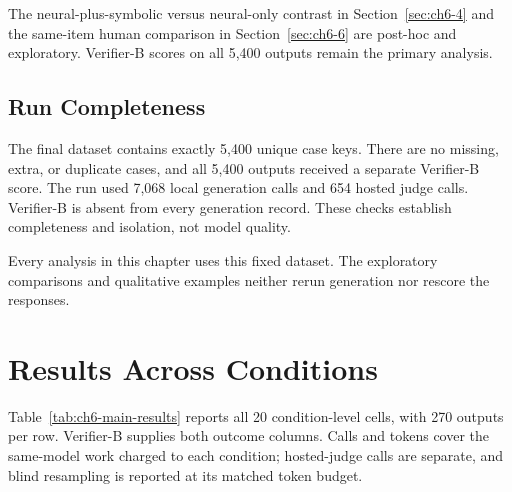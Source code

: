 The neural-plus-symbolic versus neural-only contrast in Section~\ref{sec:ch6-4} and the same-item human comparison in Section~\ref{sec:ch6-6} are post-hoc and exploratory. Verifier-B scores on all 5,400 outputs remain the primary analysis.

\subsection{Run Completeness}
\label{sec:ch6-2}

The final dataset contains exactly 5,400 unique case keys. There are no missing, extra, or duplicate cases, and all 5,400 outputs received a separate Verifier-B score. The run used 7,068 local generation calls and 654 hosted judge calls. Verifier-B is absent from every generation record. These checks establish completeness and isolation, not model quality.

Every analysis in this chapter uses this fixed dataset. The exploratory comparisons and qualitative examples neither rerun generation nor rescore the responses.

\section{Results Across Conditions}
\label{sec:ch6-3}

Table~\ref{tab:ch6-main-results} reports all 20 condition-level cells, with 270 outputs per row. Verifier-B supplies both outcome columns. Calls and tokens cover the same-model work charged to each condition; hosted-judge calls are separate, and blind resampling is reported at its matched token budget.

